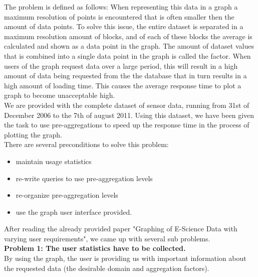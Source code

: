 The problem is defined as follows: When representing this data in a graph a maximum resolution of points is encountered that is often smaller then the amount of data points. To solve this issue, the entire dataset is separated in a maximum resolution amount of blocks, and of each of these blocks the average is calculated and shown as a data point in the graph. The amount of dataset values that is combined into a single data point in the graph is called the factor. When users of the graph request data over a large period, this will result in a high amount of data being requested from the the database that in turn results in a high amount of loading time. This causes the average response time to plot a graph to become unacceptable high.\\



We are provided with the complete dataset of sensor data, running from 31st of December 2006 to the 7th of august 2011. Using this dataset, we have been given the task to use pre-aggregations to speed up the response time in the process of plotting the graph.\\

There are several preconditions to solve this problem:
\begin{itemize}
\item maintain usage statistics 
\item re-write queries to use pre-aggregation levels
\item re-organize pre-aggregation levels
\item use the graph user interface provided.
\end{itemize}

After reading the already provided paper "Graphing of E-Science Data with varying user requirements", we came up with several sub problems.\\

\textbf{Problem 1: The user statistics have to be collected.}\\
By using the graph, the user is providing us with important information about the requested data (the desirable domain and aggregation factors).\\

